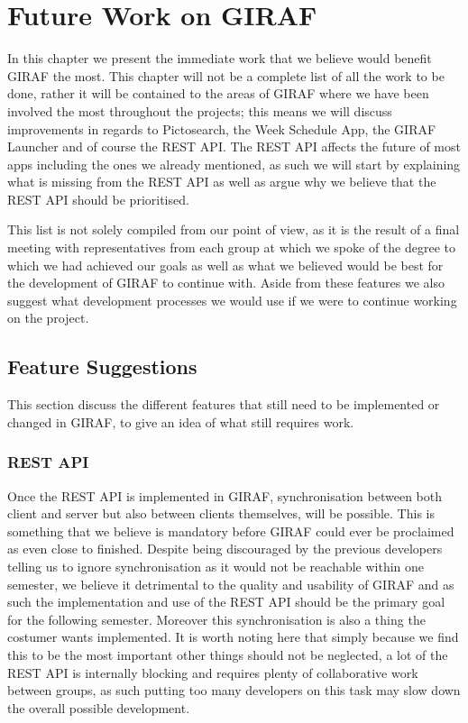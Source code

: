 \chapter{Future Work on GIRAF}\label{chp:futureworks}
In this chapter we present the immediate work that we believe would benefit GIRAF the most.
This chapter will not be a complete list of all the work to be done, rather it will be contained to the areas of GIRAF where we have been involved the most throughout the projects; this means we will discuss improvements in regards to Pictosearch, the Week Schedule App, the GIRAF Launcher and of course the REST API.
The REST API affects the future of most apps including the ones we already mentioned, as such we will start by explaining what is missing from the REST API as well as argue why we believe that the REST API should be prioritised.

This list is not solely compiled from our point of view, as it is the result of a final meeting with representatives from each group at which we spoke of the degree to which we had achieved our goals as well as what we believed would be best for the development of GIRAF to continue with.
Aside from these features we also suggest what development processes we would use if we were to continue working on the project.

\section{Feature Suggestions}
This section discuss the different features that still need to be implemented or changed in GIRAF, to give an idea of what still requires work.

\subsection*{REST API}
Once the REST API is implemented in GIRAF, synchronisation between both client and server but also between clients themselves, will be possible.
This is something that we believe is mandatory before GIRAF could ever be proclaimed as even close to finished.
Despite being discouraged by the previous developers telling us to ignore synchronisation as it would not be reachable within one semester, we believe it detrimental to the quality and usability of GIRAF and as such the implementation and use of the REST API should be the primary goal for the following semester.
Moreover this synchronisation is also a thing the costumer wants implemented.
It is worth noting here that simply because we find this to be the most important other things should not be neglected, a lot of the REST API is internally blocking and requires plenty of collaborative work between groups, as such putting too many developers on this task may slow down the overall possible development.

